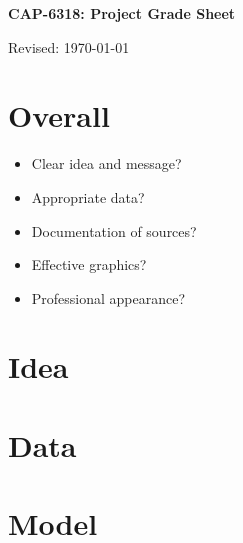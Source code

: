\documentclass[11pt]{article}
\begin{document}



\pagebreak
\thispagestyle{empty}


\bigskip\bigskip
\centerline{\Large \bf CAP-6318:  Project Grade Sheet}
\centerline{Revised: \today}


\section*{Overall}

\begin{itemize} %
      \item Clear idea and message?
      \item Appropriate data?
      \item Documentation of sources?
      \item Effective graphics?
      \item Professional appearance?
\end{itemize}
\bigskip

\section*{Idea}

\vspace*{0.5in}



\section*{Data}

\vspace*{0.5in}


\section*{Model}

\vspace*{0.5in}
\end{document}
